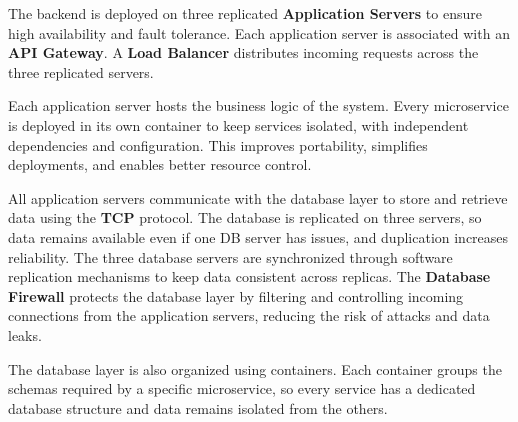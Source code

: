 \noindent The backend is deployed on three replicated \textbf{Application Servers} to ensure high availability and fault tolerance. Each application server is associated with an \textbf{API Gateway}. A \textbf{Load Balancer} distributes incoming requests across the three replicated servers.

\noindent Each application server hosts the business logic of the system. Every microservice is deployed in its own container to keep services isolated, with independent dependencies and configuration. This improves portability, simplifies deployments, and enables better resource control.

\noindent All application servers communicate with the database layer to store and retrieve data using the \textbf{TCP} protocol. The database is replicated on three servers, so data remains available even if one DB server has issues, and duplication increases reliability. The three database servers are synchronized through software replication mechanisms to keep data consistent across replicas. The \textbf{Database Firewall} protects the database layer by filtering and controlling incoming connections from the application servers, reducing the risk of attacks and data leaks.

\noindent The database layer is also organized using containers. Each container groups the schemas required by a specific microservice, so every service has a dedicated database structure and data remains isolated from the others.
